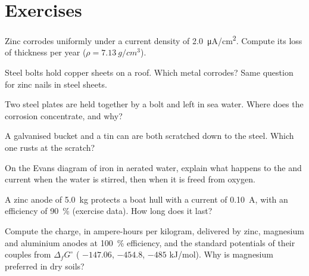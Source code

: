 \section{Exercises}

\begin{exercise}[$\star$]\label{exo:b2:corrosion:1}
Zinc corrodes uniformly under a current density of \qty{2.0}{\micro A/cm^2}.
Compute its loss of thickness per year ($\rho = \qty{7.13}{g/cm^3}$).
\end{exercise}

\begin{exercise}[$\star$]\label{exo:b2:corrosion:2}
Steel bolts hold copper sheets on a roof. Which metal corrodes? Same question
for zinc nails in steel sheets.
\end{exercise}

\begin{exercise}[$\star$]\label{exo:b2:corrosion:3}
Two steel plates are held together by a bolt and left in sea water. Where does
the corrosion concentrate, and why?
\end{exercise}

\begin{exercise}[$\star$]\label{exo:b2:corrosion:4}
A galvanised bucket and a tin can are both scratched down to the steel. Which
one rusts at the scratch?
\end{exercise}

\begin{exercise}[$\star\star$]\label{exo:b2:corrosion:5}
On the Evans diagram of iron in aerated water, explain what happens to the
 and current when the water is stirred, then when it is
freed from oxygen.
\end{exercise}

\begin{exercise}[$\star\star$]\label{exo:b2:corrosion:6}
A zinc anode of \qty{5.0}{kg} protects a boat hull with a current of
\qty{0.10}{A}, with an efficiency of 90~\% (exercise data). How long does it
last?
\end{exercise}

\begin{exercise}[$\star\star$]\label{exo:b2:corrosion:7}
Compute the charge, in ampere-hours per kilogram, delivered by zinc, magnesium
and aluminium anodes at 100~\% efficiency, and the standard potentials of
their couples from $\Delta_f G^\circ$ ( $-147.06$,  $-454.8$,
 $-485$ \unit{kJ/mol}). Why is magnesium preferred in dry soils?
\end{exercise}

